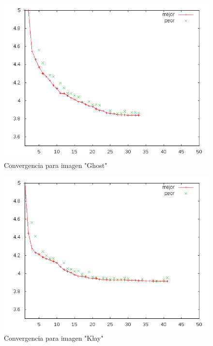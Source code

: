 \begin{figure}[h]\label{img:plot_ghost}
    \includegraphics[width=1.0\textwidth]{plot_ghost}
    \caption{Convergencia para imagen "Ghost"}
    \label{fig:huffman}
\end{figure}

\begin{figure}[h]\label{img:plot_klay}
    \includegraphics[width=1.0\textwidth]{plot_klay}
    \caption{Convergencia para imagen "Klay"}
    \label{fig:huffman}
\end{figure}

